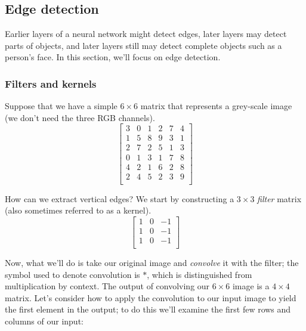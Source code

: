 \documentclass[12pt]{article}
\begin{document}
\subsection{Edge detection} Earlier layers of a neural network might detect edges, later layers may detect parts
of objects, and later layers still may detect complete objects such as a person's face. In this section, we'll focus on edge 
detection. 
\subsubsection{Filters and kernels}
Suppose that we have a simple $6 \times 6$ matrix that represents a grey-scale image (we don't need the three RGB channels).
\begin{equation*}   \begin{bmatrix}     3 & 0 & 1 & 2 & 7 & 4 \\
    1 & 5 & 8 & 9 & 3 & 1 \\     2 & 7 & 2 & 5 & 1 & 3 \\     
    0 & 1 & 3 & 1 & 7 & 8 \\     
    4 & 2 & 1 & 6 & 2 & 8 \\     
    2 & 4 & 5 & 2 & 3 & 9 \\ 
  \end{bmatrix} \end{equation*}

How can we extract vertical edges? We start by constructing a $3 \times 3$ \emph{filter} matrix (also sometimes referred to as a kernel).
\begin{equation*}   \begin{bmatrix}     1 & 0 & -1 \\     1 & 0 & -1 \\
    1 & 0 & -1 \\
  \end{bmatrix} \end{equation*}

Now, what we'll do is take our original image and \emph{convolve} it with the filter; the symbol used to denote convolution is $*$,
which is distinguished from multiplication by context. The output of convolving our $6 \times 6$ image is a $4 \times 4$ matrix. Let's consider how to apply the convolution to our input image to yield the first element in the output; to do this we'll examine the first few rows and columns of our input:
\end{document}
